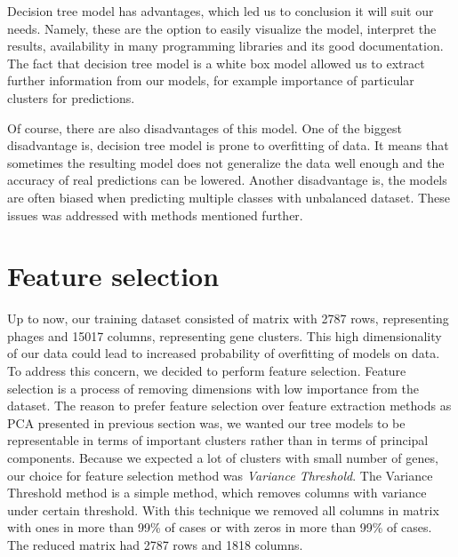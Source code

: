 Decision tree model has advantages, which led us to conclusion it will suit our needs.
Namely, these are the option to easily visualize the model, interpret the results, availability in many programming libraries and its good documentation.
The fact that decision tree model is a white box model allowed us to extract further information from our models, for example importance of particular clusters for predictions.

Of course, there are also disadvantages of this model.
One of the biggest disadvantage is, decision tree model is prone to overfitting of data.
It means that sometimes the resulting model does not generalize the data well enough and the accuracy of real predictions can be lowered.
Another disadvantage is, the models are often biased when predicting multiple classes with unbalanced dataset.
These issues was addressed with methods mentioned further.

\section{Feature selection}
Up to now, our training dataset consisted of matrix with 2787 rows, representing phages and 15017 columns, representing gene clusters.
This high dimensionality of our data could lead to increased probability of overfitting of models on data.
To address this concern, we decided to perform feature selection.
Feature selection is a process of removing dimensions with low importance from the dataset.
The reason to prefer feature selection over feature extraction methods as PCA presented in previous section was, we wanted our tree models to be representable in terms of important clusters rather than in terms of principal components.
Because we expected a lot of clusters with small number of genes, our choice for feature selection method was \emph{Variance Threshold}.
The Variance Threshold method is a simple method, which removes columns with variance under certain threshold.
With this technique we removed all columns in matrix with ones in more than 99\% of cases or with zeros in more than 99\% of cases.
The reduced matrix had 2787 rows and 1818 columns.

